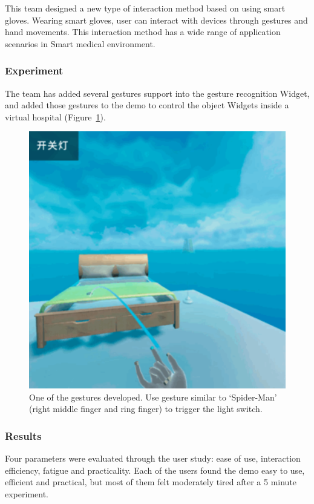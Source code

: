 This team designed a new type of interaction method based on using smart gloves. Wearing smart gloves, user can interact with devices through gestures and hand movements. This interaction method has a wide range of application scenarios in Smart medical environment. 

\subsubsection{Experiment}

The team has added several gestures support into the gesture recognition Widget, and added those gestures to the demo to control the object Widgets inside a virtual hospital (Figure~\ref{fig:Project4-figure}).

\begin{figure}
  \centering
  \includegraphics[width=0.9\linewidth]{figures/Project_4.png}
  \caption{One of the gestures developed. Use gesture similar to ‘Spider-Man’ (right middle finger and ring finger) to trigger the light switch.}
  \label{fig:Project4-figure}
\end{figure}

\subsubsection{Results}
Four parameters were evaluated through the user study: ease of use, interaction efficiency, fatigue and practicality. Each of the users found the demo easy to use, efficient and practical, but most of them felt moderately tired after a 5 minute experiment.

